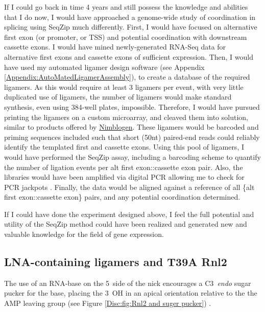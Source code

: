     If I could go back in time 4 years and still possess the knowledge and abilities that I do now, I would have approached a genome-wide study of coordination in splicing using SeqZip much differently. First, I would have focused on alternative first exon (or promoter, or TSS) and potential coordination with downstream cassette exons. I would have mined newly-generated RNA-Seq data \citep{Wang2008, Pan2008} for alternative first exons and cassette exons of sufficient expression. Then, I would have used my automated ligamer design software (see Appendix \ref{Appendix:AutoMatedLigamerAssembly}), to create a database of the required ligamers. As this would require at least 3 ligamers per event, with very little duplicated use of ligamers, the number of ligamers would make standard synthesis, even using 384-well plates, impossible. Therefore, I would have pursued printing the ligamers on a custom microarray, and cleaved them into solution, similar to products offered by \href{http://www.nimblegen.com/}{Nimblogen}. These ligamers would be barcoded and priming sequences included such that short (50nt) paired-end reads could reliably identify the templated first and cassette exons. Using this pool of ligamers, I would have performed the SeqZip assay, including a barcoding scheme to quantify the number of ligation events per {alt first exon::cassette exon} pair. Also, the libraries would have been amplified via digital PCR allowing me to check for PCR jackpots \citep{Shiroguchi2012a}. Finally, the data would be aligned against a reference of all \{alt first exon::cassette exon\} pairs, and any potential coordination determined.

    If I could have done the experiment designed above, I feel the full potential and utility of the SeqZip method could have been realized and generated new and valuable knowledge for the field of gene expression.

  \subsection{LNA-containing ligamers and T39A Rnl2}
    \label{Disc:subsec:LNA-Containing ligamers and T39A Rnk2}

    The use of an RNA-base on the 5\textprime~side of the nick encourages a C3\textprime~\textit{endo} sugar pucker for the base, placing the 3\textprime~OH in an apical orientation relative to the the AMP leaving group (see Figure \ref{Disc:fig:Rnl2 and suger pucker}) \citep{Nandakumar2006}.

